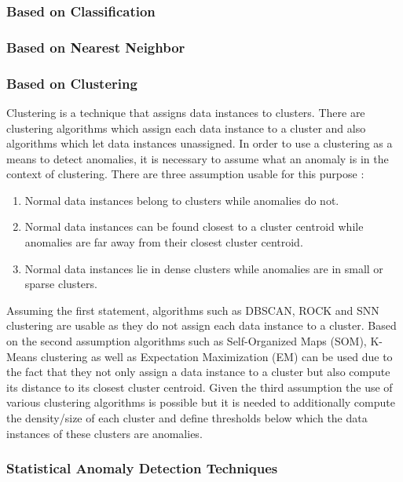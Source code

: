 \documentclass{dima}
\begin{document}
\subsubsection{Based on Classification}

\subsubsection{Based on Nearest Neighbor}

\subsubsection{Based on Clustering}
\label{sec:BoClus}

Clustering is a technique that assigns data instances to clusters. There are clustering algorithms which assign each data instance to a cluster and also algorithms which let data instances unassigned. In order to use a clustering as a means to detect anomalies, it is necessary to assume what an anomaly is in the context of clustering. There are three assumption usable for this purpose \cite{Chandola:2009:ADS:1541880.1541882}:
\begin{enumerate}
\item Normal data instances belong to clusters while anomalies do not.
\item Normal data instances can be found closest to a cluster centroid while anomalies are far away from their closest cluster centroid.
\item Normal data instances lie in dense clusters while anomalies are in small or sparse clusters.
\end{enumerate}
Assuming the first statement, algorithms such as DBSCAN, ROCK and SNN clustering are usable as they do not assign each data instance to a cluster. Based on the second assumption algorithms such as Self-Organized Maps (SOM), K-Means clustering as well as Expectation Maximization (EM) can be used due to the fact that they not only assign a data instance to a cluster but also compute its distance to its closest cluster centroid. Given the third assumption the use of various clustering algorithms is possible but it is needed to additionally compute the density/size of each cluster and define thresholds below which the data instances of these clusters are anomalies.

\subsubsection{Statistical Anomaly Detection Techniques}
\end{document}

